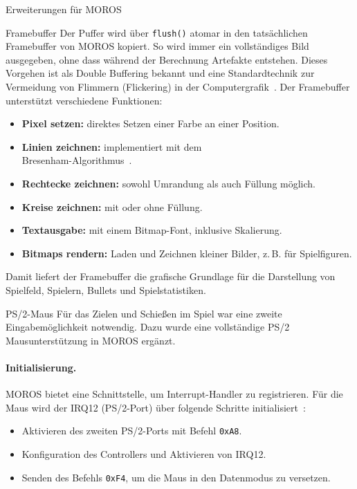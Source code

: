 \begin{section}{Erweiterungen für MOROS}
\begin{subsection}{Framebuffer}
Der Puffer wird über \texttt{flush()} atomar in den tatsächlichen Framebuffer von MOROS kopiert.
So wird immer ein vollständiges Bild ausgegeben, ohne dass während der Berechnung Artefakte entstehen. Dieses Vorgehen ist als Double Buffering bekannt und eine Standardtechnik zur Vermeidung von Flimmern (Flickering) in der Computergrafik~\cite{osdev_double_buffering}.
Der Framebuffer unterstützt verschiedene Funktionen:
\begin{itemize}
    \item \textbf{Pixel setzen:} direktes Setzen einer Farbe an einer Position.
    \item \textbf{Linien zeichnen:} implementiert mit dem \\Bresenham-Algorithmus~\cite{bresenham1965algorithm}.
    \item \textbf{Rechtecke zeichnen:} sowohl Umrandung als auch Füllung möglich.
    \item \textbf{Kreise zeichnen:} mit oder ohne Füllung.
    \item \textbf{Textausgabe:} mit einem Bitmap-Font, inklusive Skalierung.
    \item \textbf{Bitmaps rendern:} Laden und Zeichnen kleiner Bilder, z.\,B. für Spielfiguren.
\end{itemize}

Damit liefert der Framebuffer die grafische Grundlage für die Darstellung von Spielfeld, Spielern, Bullets und Spielstatistiken.
\end{subsection}

\begin{subsection}{PS/2-Maus}
Für das Zielen und Schießen im Spiel war eine zweite Eingabemöglichkeit notwendig.
Dazu wurde eine vollständige PS/2 Mausunterstützung in MOROS ergänzt.
\paragraph{Initialisierung.}
MOROS bietet eine Schnittstelle, um Interrupt-Handler zu registrieren.
Für die Maus wird der IRQ12 (PS/2-Port) über folgende Schritte initialisiert~\cite{osdev_ps2_mouse, intel8259a_pic}:
\begin{itemize}
    \item Aktivieren des zweiten PS/2-Ports mit Befehl \texttt{0xA8}.
    \item Konfiguration des Controllers und Aktivieren von IRQ12.
    \item Senden des Befehls \texttt{0xF4}, um die Maus in den Datenmodus zu versetzen.
\end{itemize}


\end{subsection}
\end{section}
